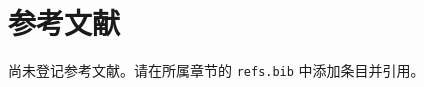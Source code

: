 \chapter{参考文献}
\label{ch:references}

\ifHasBibliography
  \renewcommand{\bibsection}{}%
  
  
\else
  \noindent 尚未登记参考文献。请在所属章节的 \texttt{refs.bib} 中添加条目并引用。
\fi

